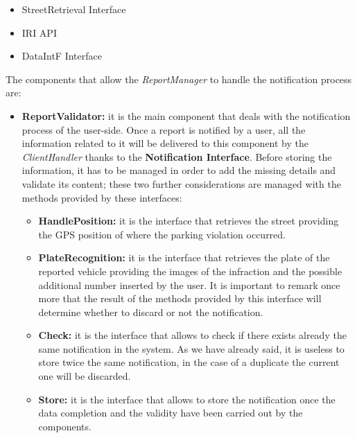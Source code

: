 			\begin{itemize}
				\item StreetRetrieval Interface
				\item IRI API
				\item DataIntF Interface
			\end{itemize}
		
			The components that allow the \emph{ReportManager} to handle the notification process are:
			
			\begin{itemize}
				\item \textbf{ReportValidator:} it is the main component that deals with the notification process of the user-side. Once a report is notified by a user, all the information related to it will be delivered to this component by the \emph{ClientHandler} thanks to the \textbf{Notification Interface}. Before storing the information, it has to be managed in order to add the missing details and validate its content; these two further considerations are managed with the methods provided by these interfaces:
				
				\begin{itemize}
					\item \textbf{HandlePosition:} it is the interface that retrieves the street providing the GPS position of where the parking violation occurred.
					
					\item \textbf{PlateRecognition:} it is the interface that retrieves the plate of the reported vehicle providing the images of the infraction and the possible additional number inserted by the user. It is important to remark once more that the result of the methods provided by this interface will determine whether to discard or not the notification.
					
					\item \textbf{Check:} it is the interface that allows to check if there exists already the same notification in the system. As we have already said, it is useless to store twice the same notification, in the case of a duplicate the current one will be discarded.
					
					\item \textbf{Store:} it is the interface that allows to store the notification once the data completion and the validity have been carried out by the components.
				\end{itemize}
			\end{itemize}
			
